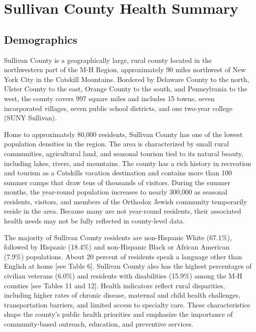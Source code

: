 \documentclass[
  english,
  letterpaper,
]{report}
\begin{document}
\section{Sullivan County Health
Summary}\label{sullivan-county-health-summary}

\subsection{Demographics}\label{demographics-4}

Sullivan County is a geographically large, rural county located in the
northwestern part of the M-H Region, approximately 90 miles northwest of
New York City in the Catskill Mountains. Bordered by Delaware County to
the north, Ulster County to the east, Orange County to the south, and
Pennsylvania to the west, the county covers 997 square miles and
includes 15 towns, seven incorporated villages, seven public school
districts, and one two-year college (SUNY Sullivan).

Home to approximately 80,000 residents, Sullivan County has one of the
lowest population densities in the region. The area is characterized by
small rural communities, agricultural land, and seasonal tourism tied to
its natural beauty, including lakes, rivers, and mountains. The county
has a rich history in recreation and tourism as a Catskills vacation
destination and contains more than 100 summer camps that draw tens of
thousands of visitors. During the summer months, the year-round
population increases to nearly 300,000 as seasonal residents, visitors,
and members of the Orthodox Jewish community temporarily reside in the
area. Because many are not year-round residents, their associated health
needs may not be fully reflected in county-level data.

The majority of Sullivan County residents are non-Hispanic White
(67.1\%), followed by Hispanic (18.4\%) and non-Hispanic Black or
African American (7.9\%) populations. About 20 percent of residents
speak a language other than English at home {[}see Table 6{]}. Sullivan
County also has the highest percentages of civilian veterans (6.0\%) and
residents with disabilities (15.9\%) among the M-H counties {[}see
Tables 11 and 12{]}. Health indicators reflect rural disparities,
including higher rates of chronic disease, maternal and child health
challenges, transportation barriers, and limited access to specialty
care. These characteristics shape the county's public health priorities
and emphasize the importance of community-based outreach, education, and
preventive services.
\end{document}

